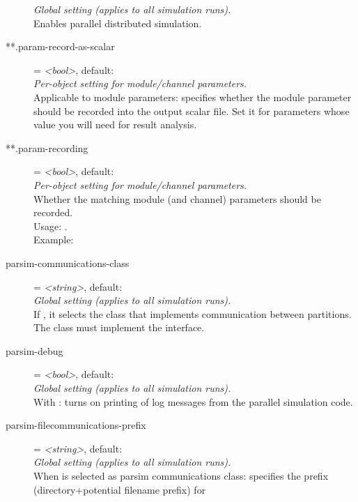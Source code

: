 \begin{description}
    \textit{Global setting (applies to all simulation runs).}\\
    Enables parallel distributed simulation.
\item[**.param-record-as-scalar] = \textit{<bool>}, default: \\
    \textit{Per-object setting for module/channel parameters.}\\
    Applicable to module parameters: specifies whether the module parameter
    should be recorded into the output scalar file. Set it for parameters whose
    value you will need for result analysis.
\item[**.param-recording] = \textit{<bool>}, default: \\
    \textit{Per-object setting for module/channel parameters.}\\
    Whether the matching module (and channel) parameters should be recorded.\\
    Usage:
    .\\
    Example:
\item[parsim-communications-class] = \textit{<string>}, default: \\
    \textit{Global setting (applies to all simulation runs).}\\
    If , it selects the
    class that implements communication between partitions. The class must
    implement the  interface.
\item[parsim-debug] = \textit{<bool>}, default: \\
    \textit{Global setting (applies to all simulation runs).}\\
    With : turns on
    printing of log messages from the parallel simulation code.
\item[parsim-filecommunications-prefix] = \textit{<string>}, default: \\
    \textit{Global setting (applies to all simulation runs).}\\
    When  is selected as parsim communications
    class: specifies the prefix (directory+potential filename prefix) for

\end{description}
